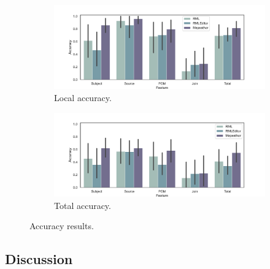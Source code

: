 \begin{figure}[t!]
    \centering
    \begin{subfigure}[b]{\linewidth}
    	\includegraphics[width=\linewidth]{figures/mapeathor_rel-acc.pdf}
    	\caption{Local accuracy.}
    	\label{fig:chp5_mapeathor_relacc}
    \end{subfigure}
    \begin{subfigure}[b]{\linewidth}
    	\includegraphics[width=\linewidth]{figures/mapeathor_total-acc.pdf}
    	\caption{Total accuracy.}
    	\label{fig:chp5_mapeathor_totacc}
    \end{subfigure}
    \caption{Accuracy results.}
    \label{fig:reification-app}
\end{figure}





\subsection{Discussion}
\label{sec:chp5_mapeathor_discussion}
\newpage